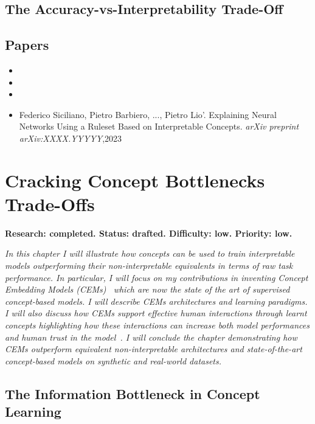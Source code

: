 \documentclass[withindex,glossary]{cam-thesis}
\begin{document}
\section{The Accuracy-vs-Interpretability Trade-Off}

\section*{Papers}
\nobibliography*
\begin{itemize}
    \item {}
    \item {}
    \item {}
    \item Federico Siciliano, Pietro Barbiero, ..., Pietro Lio'. Explaining Neural Networks Using a Ruleset Based on Interpretable Concepts. \textit{arXiv preprint arXiv:XXXX.YYYYY},2023
\end{itemize}


\chapter{Cracking Concept Bottlenecks Trade-Offs} \label{chapter:cem}
\textbf{Research: completed. Status: drafted. Difficulty: low. Priority: low.}

\textit{In this chapter I will illustrate how concepts can be used to train interpretable models outperforming their non-interpretable equivalents in terms of raw task performance. In particular, I will focus on my contributions in inventing Concept Embedding Models (CEMs)~\citep{zarlenga2022concept} which are now the state of the art of supervised concept-based models. I will describe CEMs architectures and learning paradigms. I will also discuss how CEMs support effective human interactions through learnt concepts highlighting how these interactions can increase both model performances and human trust in the model~\citep{shen2022trust}. I will conclude the chapter demonstrating how CEMs outperform equivalent non-interpretable architectures and state-of-the-art concept-based models on synthetic and real-world datasets.}

\section{The Information Bottleneck in Concept Learning}
\end{document}
